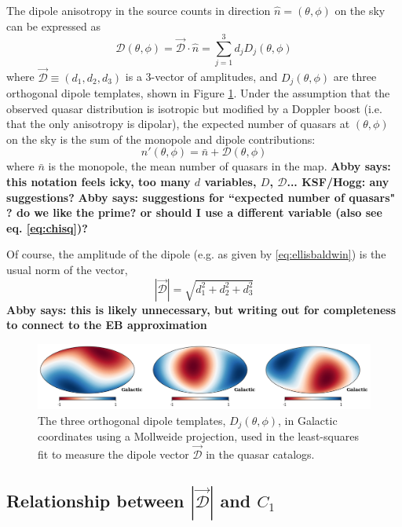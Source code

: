 \documentclass[modern]{aastex631}
\newcommand{\abby}[1]{\textbf{Abby says: #1}}
\begin{document}
The dipole anisotropy in the source counts in direction $\hat n=(\theta,\phi)$ on the sky can be expressed as
\begin{equation}
    \mathcal{D}(\theta,\phi)=\vec{\mathcal{D}}\cdot \hat n = \sum_{j=1}^3 d_jD_j(\theta,\phi)
\end{equation}
where $\vec{\mathcal{D}}\equiv(d_1,d_2,d_3)$ is a 3-vector of amplitudes, and $D_j(\theta,\phi)$ are three orthogonal dipole templates, shown in Figure \ref{fig:dipole_templates}.
Under the assumption that the observed quasar distribution is isotropic but modified by a Doppler boost (i.e. that the only anisotropy is dipolar), the expected number of quasars at $(\theta,\phi)$ on the sky is the sum of the monopole and dipole contributions:
\begin{equation}
\label{eq:dipole_model}
    n'(\theta,\phi) = \bar n + \mathcal{D}(\theta,\phi)
\end{equation}
where $\bar n$ is the monopole, the mean number of quasars in the map.
\abby{this notation feels icky, too many $d$ variables, $D$, $\mathcal{D}$... KSF/Hogg: any suggestions?}
\abby{suggestions for ``expected number of quasars" ? do we like the prime? or should I use a different variable (also see eq. \ref{eq:chisq})?}

Of course, the amplitude of the dipole (e.g. as given by \ref{eq:ellisbaldwin}) is the usual norm of the vector,
\begin{equation}
    |\vec{\mathcal{D}}|=\sqrt{d_1^2 + d_2^2 + d_3^2}
\end{equation}
\abby{this is likely unnecessary, but writing out for completeness to connect to the EB approximation}

\begin{figure}
    \centering
    \includegraphics[width=\textwidth]{images/dipole_templates.png}
    \caption{The three orthogonal dipole templates, $D_j(\theta,\phi)$, in Galactic coordinates using a Mollweide projection, used in the least-squares fit to measure the dipole vector $\vec{\mathcal{D}}$ in the quasar catalogs.}
    \label{fig:dipole_templates}
\end{figure}

\subsection{Relationship between $|\vec{\mathcal{D}}|$ and $C_1$}
\end{document}
